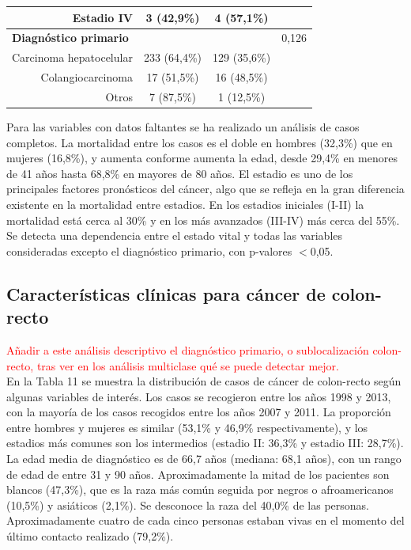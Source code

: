 \begin{table}[H]
\begin{tabular}{rccc}
		Estadio IV                                        & 3 (42,9\%)     & 4 (57,1\%)          &                      \\ \hline
		\multicolumn{1}{l}{\textbf{Diagnóstico primario}} &                &                     & 0,126                \\
		Carcinoma hepatocelular                           & 233 (64,4\%)   & 129 (35,6\%)        &                      \\
		Colangiocarcinoma                                 & 17 (51,5\%)    & 16 (48,5\%)         &                      \\
		Otros                                             & 7 (87,5\%)     & 1 (12,5\%)          &                      \\ \hline
	\end{tabular}
\end{table}

Para las variables con datos faltantes se ha realizado un análisis de casos completos.  La mortalidad entre los casos es el doble en hombres (32,3\%) que en mujeres (16,8\%), y aumenta conforme aumenta la edad, desde 29,4\% en menores de 41 años hasta 68,8\% en mayores de 80 años. El estadio es uno de los principales factores pronósticos del cáncer, algo que se refleja en la gran diferencia existente en la mortalidad entre estadios. En los estadios iniciales (I-II) la mortalidad está cerca al 30\% y en los más avanzados (III-IV) más cerca del 55\%. Se detecta una dependencia entre el estado vital y todas las variables consideradas excepto el diagnóstico primario, con p-valores $<$0,05.

\subsection{Características clínicas para cáncer de colon-recto}

\textcolor{red}{Añadir a este análisis descriptivo el diagnóstico primario, o sublocalización colon-recto, tras ver en los análisis multiclase qué se puede detectar mejor.}\\

En la Tabla 11 se muestra  la distribución de casos de cáncer de colon-recto según algunas variables de interés. Los casos se recogieron entre los años 1998 y 2013, con la mayoría de los casos recogidos entre los años 2007 y 2011. La proporción entre hombres y mujeres es similar (53,1\% y 46,9\% respectivamente), y los estadios más comunes son los intermedios (estadio II: 36,3\% y estadio III: 28,7\%). La edad media de diagnóstico es de 66,7 años (mediana: 68,1 años), con un rango de edad de entre 31 y 90 años. Aproximadamente la mitad de los pacientes son blancos (47,3\%), que es la raza más común seguida por negros o afroamericanos (10,5\%) y asiáticos (2,1\%). Se desconoce la raza del 40,0\% de las personas. Aproximadamente cuatro de cada cinco personas estaban vivas en el momento del último contacto realizado (79,2\%).\\

